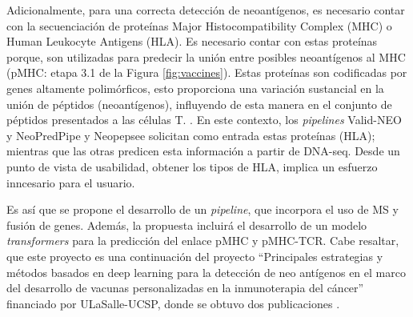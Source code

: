 \documentclass[a4paper,11pt]{article}
\begin{document}
Adicionalmente, para una correcta detección de neoantígenos, es necesario contar con la secuenciación de proteínas Major Histocompatibility Complex (MHC) o Human Leukocyte Antigens (HLA). Es necesario contar con estas proteínas porque, son utilizadas para predecir la unión entre posibles neoantígenos al MHC (pMHC: etapa 3.1 de la Figura \ref{fig:vaccines}). Estas proteínas son codificadas por genes altamente polimórficos, esto proporciona una variación sustancial en la unión de péptidos (neoantígenos), influyendo de esta manera en el conjunto de péptidos presentados a las células T. \cite{abualrous2021major}. En este contexto,  los \textit{pipelines} Valid-NEO \cite{terai2022valid}  y NeoPredPipe \cite{schenck2019neopredpipe} y Neopepsee \cite{kim2018neopepsee} solicitan como entrada estas proteínas (HLA); mientras que las otras predicen esta información a partir de DNA-seq. Desde un punto de vista de usabilidad, obtener los tipos de HLA, implica un esfuerzo inncesario para el usuario.

Es así que se propone el desarrollo de un \textit{pipeline}, que incorpora el uso de MS y fusión de genes. Además, la propuesta incluirá el desarrollo de un modelo \textit{transformers} para la predicción del enlace pMHC y pMHC-TCR. Cabe resaltar, que este proyecto es una continuación del proyecto ``Principales estrategias y métodos basados en deep learning para la detección de neo antígenos en el marco del desarrollo de vacunas personalizadas en la inmunoterapia del cáncer'' financiado por ULaSalle-UCSP, donde se obtuvo dos publicaciones \cite{machaca2023deep,arceda2023neoantigen}. 






\end{document}
